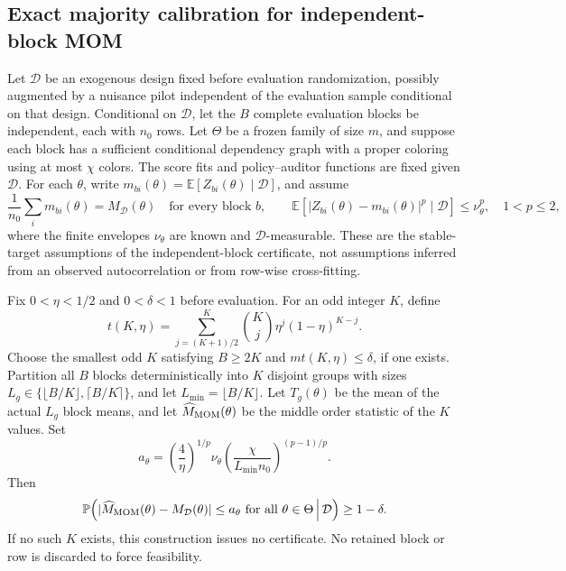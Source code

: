 
\subsection{Exact majority calibration for independent-block MOM}
\label{sec:c0-exact-majority}

Let $\mathcal D$ be an exogenous design fixed before evaluation randomization,
possibly augmented by a nuisance pilot independent of the evaluation sample
conditional on that design. Conditional on $\mathcal D$, let the $B$ complete
evaluation blocks be independent, each with $n_0$ rows. Let $\Theta$ be a frozen
family of size $m$, and suppose each block has a sufficient conditional
dependency graph with a proper coloring using at most $\chi$ colors.
The score fits and policy--auditor functions are fixed given $\mathcal D$.
For each $\theta$, write $m_{bi}(\theta)=\mathbb E[Z_{bi}(\theta)\mid\mathcal D]$,
and assume
\[
 \frac{1}{n_0}\sum_i m_{bi}(\theta)=M_{\mathcal D}(\theta)
 \quad\text{for every block }b,
 \qquad
 \mathbb E[|Z_{bi}(\theta)-m_{bi}(\theta)|^p\mid\mathcal D]
 \le \nu_\theta^p,
 \quad 1<p\le2,
\]
where the finite envelopes $\nu_\theta$ are known and
$\mathcal D$-measurable. These are the stable-target assumptions of the
independent-block certificate, not assumptions inferred from an observed
autocorrelation or from row-wise cross-fitting.

\begin{theorem}
\label{thm:c0-exact-majority}
Fix $0<\eta<1/2$ and $0<\delta<1$ before evaluation. For an odd integer $K$,
define
\[
 t(K,\eta)
 =\sum_{j=(K+1)/2}^{K}{K\choose j}\eta^j(1-\eta)^{K-j}.
\]
Choose the smallest odd $K$ satisfying $B\ge2K$ and $m t(K,\eta)\le\delta$,
if one exists. Partition all $B$ blocks deterministically into $K$ disjoint
groups with sizes $L_g\in\{\lfloor B/K\rfloor,\lceil B/K\rceil\}$, and let
$L_{\min}=\lfloor B/K\rfloor$. Let $T_g(\theta)$ be the mean of the actual
$L_g$ block means, and let $\widehat M_{\rm MOM}(\theta)$ be the middle order
statistic of the $K$ values. Set
\[
 a_\theta
 =\left(\frac4\eta\right)^{1/p}\nu_\theta
   \left(\frac{\chi}{L_{\min}n_0}\right)^{(p-1)/p}.
\]
Then
\[
 \mathbb P\!\left(
  |\widehat M_{\rm MOM}(\theta)-M_{\mathcal D}(\theta)|\le a_\theta
  \text{ for all }\theta\in\Theta\,\middle|\,\mathcal D\right)
 \ge 1-\delta.
\]
If no such $K$ exists, this construction issues no certificate. No retained
block or row is discarded to force feasibility.
\end{theorem}

